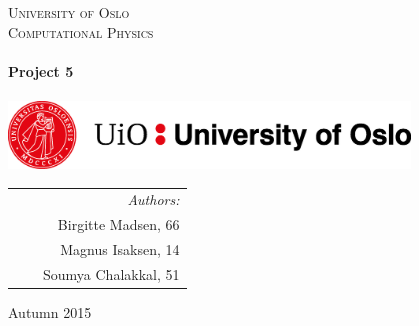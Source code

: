 \thispagestyle{empty}

\begin{center}



\textsc{\LARGE University of Oslo}\\[0.5cm]

\textsc{\Large Computational Physics}\\[2cm]
 

\HRule \\[0.4cm]
 \LARGE \textbf{Project 5}  \\[0.2cm]
\HRule \\[2.5cm]

\vspace{2cm}
\includegraphics[width=0.8\textwidth]{Figures/UiO_Seal_A_ENG.png}\\  %

\vfill 
 
\begin{tabularx}{\textwidth}{l X r}
\hline
& & \large \emph{Authors:}\\
& & \large Birgitte Madsen, 66\\
& & \large Magnus Isaksen, 14 \\
& & \large Soumya Chalakkal, 51 \\
\hline

\end{tabularx}




\vfill

{\large Autumn 2015}

\end{center}
\cleardoublepage

